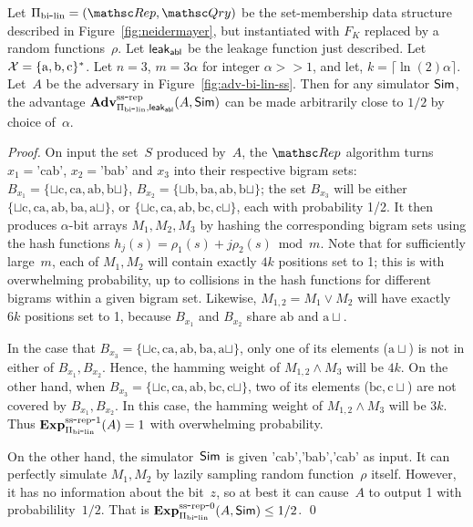 \begin{theorem}\label{thm:bi-lin-ss}
Let $\setprim_{\bilin}= (\Rep, \Qry)$ be the set-membership data structure described in Figure~\ref{fig:neidermayer}, but instantiated with $F_{K}$ replaced by a random functions~$\rho$.  Let ${\sf leak}_{\mathsf{abl}}$ be the leakage function just described.   Let~${\cal X}=\{\mathrm{a,b,c}\}^*$. Let $n=3$,  $m=3\alpha $ for integer $\alpha >> 1$, and let, $k = \lceil \ln(2) \alpha \rceil$.  Let~$A$ be the adversary in Figure~\ref{fig:adv-bi-lin-ss}.  Then for any simulator ${\sf Sim}$, the advantage $\mathrm{\mathbf{Adv}}^{\mathrm{ss\mbox{-}rep}}_{\Pi_{\mathrm{bi}\mbox{-}\mathrm{lin}},{\sf leak}_{\mathsf{abl}}}(A,{\sf Sim})$ can be made arbitrarily close to $1/2$ by choice of~$\alpha$.
\end{theorem}
\begin{proof}
On input the set~$S$ produced by~$A$, the $\Rep$ algorithm turns $x_1=$'cab', $x_2=$'bab' and $x_3$ into their respective bigram sets: $B_{x_1}=\{\sqcup\mathrm{c},\mathrm{ca},\mathrm{ab},\mathrm{b}\sqcup\}$, $B_{x_2}=\{\sqcup\mathrm{b},\mathrm{ba},\mathrm{ab}, \mathrm{b}\sqcup \}$; the set $B_{x_3}$ will be either $\{\sqcup\mathrm{c},\mathrm{ca},\mathrm{ab},\mathrm{ba}, \mathrm{a}\sqcup\}$, or $\{\sqcup\mathrm{c},\mathrm{ca},\mathrm{ab},\mathrm{bc}, \mathrm{c}\sqcup\}$, each with probability 1/2.  It then produces $\alpha$-bit arrays $M_1, M_2, M_3$ by hashing the corresponding bigram sets using the hash functions $h_j(s)=\rho_1(s)+ j\rho_2(s) \bmod m$.  Note that for sufficiently large~$m$, each of $M_1,M_2$ will contain exactly $4k$ positions set to 1; this is with overwhelming probability, up to collisions in the hash functions for different bigrams within a given bigram set.  Likewise, $M_{1,2}=M_1 \vee M_2$ will have exactly $6k$ positions set to 1, because $B_{x_1}$ and $B_{x_2}$ share $\mathrm{ab}$ and $\mathrm{a}\sqcup$.

In the case that $B_{x_3}=\{\sqcup\mathrm{c},\mathrm{ca},\mathrm{ab},\mathrm{ba}, \mathrm{a}\sqcup\}$, only one of its elements ($\mathrm{a}\sqcup$) is not in either of $B_{x_1},B_{x_2}$.  Hence, the hamming weight of $M_{1,2}\wedge M_3$ will be $4k$.  On the other hand, when $B_{x_3} = \{\sqcup\mathrm{c},\mathrm{ca},\mathrm{ab},\mathrm{bc}, \mathrm{c}\sqcup\}$, two of its elements ($\mathrm{bc}, \mathrm{c}\sqcup$) are not covered by $B_{x_1},B_{x_2}$.  In this case, the hamming weight of $M_{1,2} \wedge M_3$ will be $3k$.  Thus $\mathrm{\mathbf{Exp}}^{\mathrm{ss\mbox{-}rep\mbox{-}1}}_{\Pi_{\mathrm{bi}\mbox{-}\mathrm{lin}}}(A)=1$ with overwhelming probability.

On the other hand, the simulator~${\sf Sim}$ is given 'cab','bab','cab' as
input.  It can perfectly simulate $M_1,M_2$ by lazily sampling random
function~$\rho$ itself.  However, it has no information about the
bit~$z$, so at best it can cause~$A$ to output 1 with
probabilility~$1/2$.  That is $\mathrm{\mathbf{Exp}}^{\mathrm{ss\mbox{-}rep\mbox{-}0}}_{\Pi_{\mathrm{bi}\mbox{-}\mathrm{lin}}}(A,{\sf Sim}) \leq 1/2$. \hfill\qed
\end{proof}




